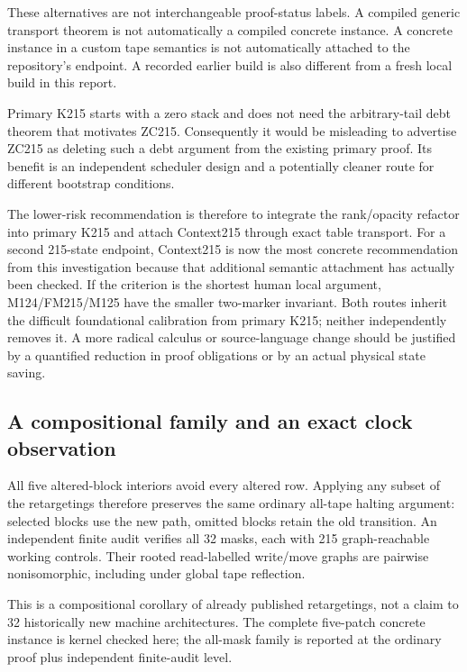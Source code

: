 \documentclass[11pt]{article}
\begin{document}
These alternatives are not interchangeable proof-status labels. A compiled generic transport theorem is not automatically a compiled concrete instance. A concrete instance in a custom tape semantics is not automatically attached to the repository's endpoint. A recorded earlier build is also different from a fresh local build in this report.

Primary K215 starts with a zero stack and does not need the arbitrary-tail debt theorem that motivates ZC215. Consequently it would be misleading to advertise ZC215 as deleting such a debt argument from the existing primary proof. Its benefit is an independent scheduler design and a potentially cleaner route for different bootstrap conditions.

The lower-risk recommendation is therefore to integrate the rank/opacity refactor into primary K215 and attach Context215 through exact table transport. For a second 215-state endpoint, Context215 is now the most concrete recommendation from this investigation because that additional semantic attachment has actually been checked. If the criterion is the shortest human local argument, M124/FM215/M125 have the smaller two-marker invariant. Both routes inherit the difficult foundational calibration from primary K215; neither independently removes it. A more radical calculus or source-language change should be justified by a quantified reduction in proof obligations or by an actual physical state saving.

\subsection{A compositional family and an exact clock observation}

All five altered-block interiors avoid every altered row. Applying any subset of the retargetings therefore preserves the same ordinary all-tape halting argument: selected blocks use the new path, omitted blocks retain the old transition. An independent finite audit verifies all 32 masks, each with 215 graph-reachable working controls. Their rooted read-labelled write/move graphs are pairwise nonisomorphic, including under global tape reflection.

This is a compositional corollary of already published retargetings, not a claim to 32 historically new machine architectures. The complete five-patch concrete instance is kernel checked here; the all-mask family is reported at the ordinary proof plus independent finite-audit level.
\end{document}
